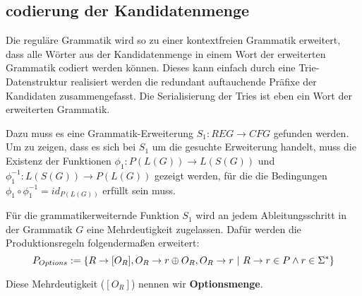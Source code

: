 \documentclass[]{article}
\begin{document}
\subsection{codierung der Kandidatenmenge}
Die reguläre Grammatik wird so zu einer kontextfreien Grammatik erweitert, dass alle Wörter aus der Kandidatenmenge in einem Wort der erweiterten Grammatik codiert werden können. Dieses kann einfach durch eine Trie-Datenstruktur realisiert werden die redundant auftauchende Präfixe der Kandidaten zusammengefasst. Die Serialisierung der Tries ist eben ein Wort der erweiterten Grammatik.

Dazu muss es eine Grammatik-Erweiterung $S_1: REG\rightarrow CFG$ gefunden werden.
Um zu zeigen, dass es sich bei $S_1$ um die gesuchte Erweiterung handelt, muss die Existenz der Funktionen $\phi_1: P(L(G)) \rightarrow L(S(G))$ und $\phi_1^{-1}: L(S(G)) \rightarrow P(L(G))$ gezeigt werden, für die die Bedingungen $\phi_1\circ\phi_1^{-1} = id_{P(L(G))}$ erfüllt sein muss.

Für die grammatikerweiternde Funktion $S_1$ wird an jedem Ableitungsschritt in der Grammatik $G$ eine Mehrdeutigkeit zugelassen. Dafür werden die Produktionsregeln folgendermaßen erweitert:
\[ 
  P_{Options} := \{R \rightarrow [O_R], O_R \rightarrow r\oplus O_R, O_R \rightarrow r \ \vert\ R\rightarrow r\in P \land r\in \Sigma^*\} \\
\] 

Diese Mehrdeutigkeit ($[O_R]$) nennen wir \textbf{Optionsmenge}.



% 

% 
\end{document}
